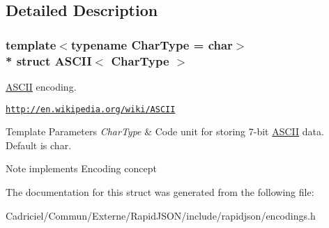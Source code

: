 \subsection{Detailed Description}
\subsubsection*{template$<$typename Char\+Type = char$>$\\*
struct A\+S\+C\+I\+I$<$ Char\+Type $>$}

\hyperlink{struct_a_s_c_i_i}{A\+S\+C\+II} encoding. 

\href{http://en.wikipedia.org/wiki/ASCII}{\tt http\+://en.\+wikipedia.\+org/wiki/\+A\+S\+C\+II} 
\begin{DoxyTemplParams}{Template Parameters}
{\em Char\+Type} & Code unit for storing 7-\/bit \hyperlink{struct_a_s_c_i_i}{A\+S\+C\+II} data. Default is char. \\
\hline
\end{DoxyTemplParams}
\begin{DoxyNote}{Note}
implements Encoding concept 
\end{DoxyNote}


The documentation for this struct was generated from the following file\+:\begin{DoxyCompactItemize}
\item 
Cadriciel/\+Commun/\+Externe/\+Rapid\+J\+S\+O\+N/include/rapidjson/encodings.\+h\end{DoxyCompactItemize}
